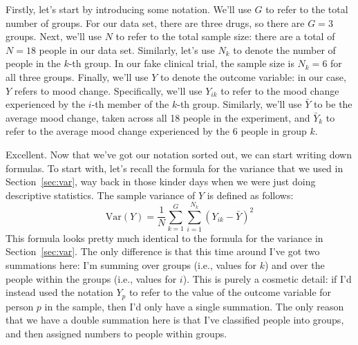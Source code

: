 
Firstly, let's start by introducing some notation. We'll use $G$ to refer to the total number of groups. For our data set, there are three drugs, so there are $G=3$ groups. Next, we'll use $N$ to refer to the total sample size: there are a total of $N=18$ people in our data set. Similarly, let's use $N_k$ to denote the number of people in the $k$-th group. In our fake clinical trial, the sample size is $N_k = 6$ for all three groups. Finally, we'll use $Y$ to denote the outcome variable: in our case, $Y$ refers to mood change. Specifically, we'll use $Y_{ik}$ to refer to the mood change experienced by the $i$-th member of the $k$-th group. Similarly, we'll use $\bar{Y}$ to be the average mood change, taken across all 18 people in the experiment, and $\bar{Y}_k$ to refer to the average mood change experienced by the 6 people in group $k$.  

Excellent. Now that we've got our notation sorted out, we can start writing down formulas. To start with, let's recall the formula for the variance that we used in Section~\ref{sec:var}, way back in those kinder days when we were just doing descriptive statistics. The sample variance of $Y$ is defined as follows:
$$
\mbox{Var}(Y) = \frac{1}{N} \sum_{k=1}^G \sum_{i=1}^{N_k} \left(Y_{ik} - \bar{Y} \right)^2
$$
This formula looks pretty much identical to the formula for the variance in Section~\ref{sec:var}. The only difference is that this time around I've got two summations here: I'm summing over groups (i.e., values for $k$) and over the people within the groups (i.e., values for $i$). This is purely a cosmetic detail: if I'd instead used the notation $Y_p$ to refer to the value of the outcome variable for person $p$ in the sample, then I'd only have a single summation. The only reason that we have a double summation here is that I've classified people into groups, and then assigned numbers to people within groups. 

